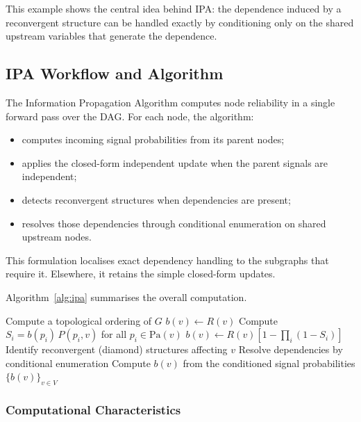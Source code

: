 \documentclass[preprint,12pt]{elsarticle}
\begin{document}
This example shows the central idea behind IPA: the dependence induced by a reconvergent structure can be handled exactly by conditioning only on the shared upstream variables that generate the dependence.

\subsection{IPA Workflow and Algorithm}

The Information Propagation Algorithm computes node reliability in a single forward pass over the DAG. For each node, the algorithm:
\begin{itemize}
    \item computes incoming signal probabilities from its parent nodes;
    \item applies the closed-form independent update when the parent signals are independent;
    \item detects reconvergent structures when dependencies are present;
    \item resolves those dependencies through conditional enumeration on shared upstream nodes.
\end{itemize}

This formulation localises exact dependency handling to the subgraphs that require it. Elsewhere, it retains the simple closed-form updates.

Algorithm~\ref{alg:ipa} summarises the overall computation.

\begin{algorithm}[h]
\caption{Information Propagation Algorithm (IPA)}
\label{alg:ipa}
\begin{algorithmic}[1]
\STATE Compute a topological ordering of $G$
        \STATE $b(v) \gets R(v)$
    \ELSE
        \STATE Compute $S_i = b(p_i)\,P(p_i,v)$ for all $p_i \in \text{Pa}(v)$
            \STATE $b(v) \gets R(v)\left[1-\prod_i (1-S_i)\right]$
        \ELSE
            \STATE Identify reconvergent (diamond) structures affecting $v$
            \STATE Resolve dependencies by conditional enumeration
            \STATE Compute $b(v)$ from the conditioned signal probabilities
        \ENDIF
    \ENDIF
\ENDFOR
\RETURN $\{b(v)\}_{v \in V}$
\end{algorithmic}
\end{algorithm}

\subsubsection{Computational Characteristics}
\end{document}
